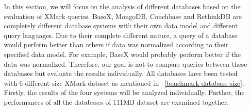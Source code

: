 In this section, we will focus on the analysis of different databases based on the  evaluation of XMark queries. BaseX, MongoDB, Couchbase and RethinkDB are completely different database systems with their own data model and different query languages.  Due to their complete different nature, a query of a database would perform better than others if data was normalized according to their specified data model. For example, BaseX would probably perform better if the data was normalized. Therefore, our goal is not to compare queries between these databases but evaluate the results individually.  All databases have been tested with 6 different size XMark dataset as mentioned in ~\ref{benchmark-database-size}. Firstly, the results  of the four systems will be analyzed individually. Further, the performances of all the databases of 111MB dataset are examined together.

